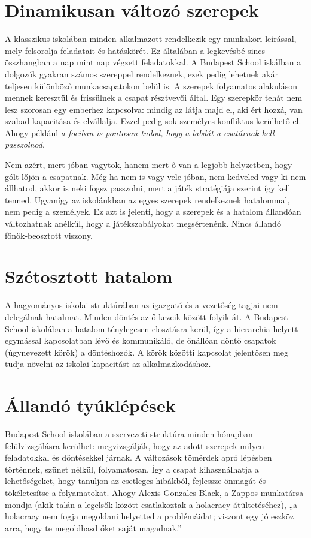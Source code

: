 \section{Dinamikusan változó szerepek}

A klasszikus iskolában minden alkalmazott rendelkezik egy munkaköri leírással, mely felsorolja feladatait és hatáskörét. Ez általában a legkevésbé sincs összhangban a nap mint nap végzett feladatokkal. A Budapest School iskálban a dolgozók gyakran számos szereppel rendelkeznek, ezek pedig lehetnek akár teljesen különböző munkacsapatokon belül is. A szerepek folyamatos alakuláson mennek keresztül és frissülnek a csapat résztvevői által. Egy szerepkör tehát nem lesz szorosan egy emberhez kapcsolva: mindig az látja majd el, aki ért hozzá, van szabad kapacitása és elvállalja. Ezzel pedig sok személyes konfliktus kerülhető el. Ahogy például
\emph{a fociban is pontosan tudod, hogy a labdát a csatárnak kell passzolnod}.

Nem azért, mert jóban vagytok, hanem mert ő van a legjobb helyzetben, hogy gólt lőjön a csapatnak. Még ha nem is vagy vele jóban, nem kedveled vagy ki nem állhatod, akkor is neki fogsz passzolni, mert a játék stratégiája szerint így kell tenned. Ugyanígy az iskolánkban az egyes szerepek rendelkeznek hatalommal, nem pedig a személyek. Ez azt is jelenti, hogy a szerepek és a hatalom állandóan változhatnak anélkül, hogy a játékszabályokat megsértenénk. Nincs állandó főnök-beosztott viszony.

\section{Szétosztott hatalom}

A hagyományos iskolai struktúrában az igazgató és a vezetőség tagjai nem delegálnak hatalmat. Minden döntés az ő kezeik között folyik át. A Budapest School iskolában a hatalom ténylegesen elosztásra kerül, így a hierarchia helyett egymással kapcsolatban lévő és kommunikáló, de önállóan döntő csapatok (úgynevezett körök) a döntéshozók. A körök közötti kapcsolat jelentősen meg tudja növelni az iskolai kapacitást az alkalmazkodáshoz.

\section{Állandó tyúklépések}

Budapest School iskolában a szervezeti struktúra minden hónapban felülvizsgálásra kerülhet: megvizsgálják, hogy az adott szerepek milyen feladatokkal és döntésekkel járnak. A változások tömérdek apró lépésben történnek, szünet nélkül, folyamatosan. Így a csapat kihasználhatja a lehetőségeket, hogy tanuljon az esetleges hibákból, fejlessze önmagát és tökéletesítse a folyamatokat. Ahogy Alexis Gonzales-Black, a Zappos munkatársa mondja (akik talán a legelsők között csatlakoztak a holacracy átültetéséhez), „a holacracy nem fogja megoldani helyetted a problémáidat; viszont egy jó eszköz arra, hogy te megoldhasd őket saját magadnak.”

